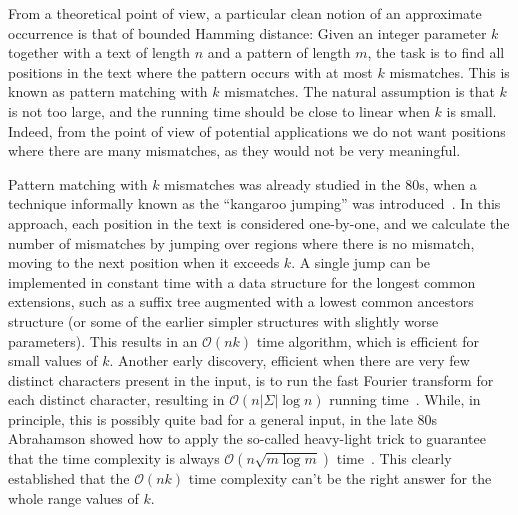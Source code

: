 \documentclass[twoside,leqno]{article}
\renewcommand{\O}{\mathcal{O}}
\begin{document}
From a theoretical point of view, a particular clean notion of an approximate occurrence is that of bounded Hamming distance: Given an integer parameter $k$ together with a text of length $n$ and a pattern of length $m$, the task is to find all
positions in the text where the pattern occurs with at most $k$ mismatches. This is known as pattern matching with $k$
mismatches. The natural assumption is that $k$ is not too large,
and the running time should be close to linear when $k$ is small. Indeed, from the point of view of potential applications we do
not want positions where there are many mismatches, as they would not be very meaningful.

Pattern matching with $k$ mismatches was already studied in the 80s, when a technique informally known as
the ``kangaroo jumping'' was introduced~\cite{Landau1986,Galil1986}. In this approach,
each position in the text is considered one-by-one, and we calculate the number of mismatches
by jumping over regions where there is no mismatch, moving to the next position when it exceeds $k$.
A single jump can be implemented in constant time with a data structure for the longest common extensions, such
as a suffix tree augmented with a lowest common ancestors structure (or some of the earlier simpler structures with slightly worse
parameters). This results in an $\O(nk)$ time algorithm, which is efficient for small values of $k$.
Another early discovery, efficient when there are very few distinct characters present in the input,
is to run the fast Fourier transform for each distinct character, resulting in $\O(n|\Sigma|\log n)$ running time~\cite{FischerP74}.
While, in principle, this is possibly quite bad for a general input, in the late 80s Abrahamson showed
how to apply the so-called heavy-light trick to guarantee that the time complexity is always
$\O(n \sqrt{m \log m})$ time~\cite{Abrahamson1987}. This clearly established that the $\O(nk)$ time complexity
can't be the right answer for the whole range values of $k$.
\end{document}
